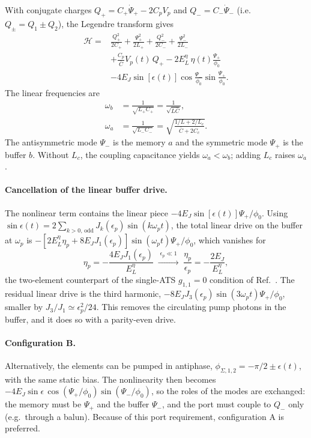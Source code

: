 \documentclass[aps,prx,reprint,floatfix,amsmath,amssymb,longbibliography]{revtex4-2}
\begin{document}
With conjugate charges $Q_+=C_+\dot{\Psi}_+-2C_pV_p$ and
$Q_-=C_-\dot{\Psi}_-$ (i.e.\ $Q_\pm=Q_1\pm Q_2$), the Legendre transform
gives
\begin{equation}
\begin{aligned}
  \mathcal{H}={}&\frac{Q_+^2}{2C_+}+\frac{\Psi_+^2}{2L_+}
  +\frac{Q_-^2}{2C_-}+\frac{\Psi_-^2}{2L_-}\\
  &+\frac{C_p}{\bar{C}}V_p(t)\,Q_+
  -2E_L^\eta\,\eta(t)\frac{\Psi_+}{\phi_0}\\
  &-4E_J\sin[\epsilon(t)]\cos\frac{\Psi_-}{\phi_0}\sin\frac{\Psi_+}{\phi_0}.
\end{aligned}
\label{eq:app_H_bis}
\end{equation}
The linear frequencies are
\begin{equation}
\begin{aligned}
  \omega_b&=\frac{1}{\sqrt{L_+C_+}}=\frac{1}{\sqrt{L\bar{C}}},\\
  \omega_a&=\frac{1}{\sqrt{L_-C_-}}=\sqrt{\frac{1/L+2/L_c}{\bar{C}+2C_c}} .
\end{aligned}
\end{equation}
The antisymmetric mode $\Psi_-$ is the memory $a$ and the symmetric mode
$\Psi_+$ is the buffer $b$. Without $L_c$, the coupling capacitance
yields $\omega_a<\omega_b$; adding $L_c$ raises $\omega_a$.

\paragraph{Cancellation of the linear buffer drive.}
The nonlinear term contains the linear piece
$-4E_J\sin[\epsilon(t)]\Psi_+/\phi_0$. Using
$\sin\epsilon(t)=2\sum_{k>0,\,\mathrm{odd}}J_k(\epsilon_p)\sin(k\omega_pt)$,
the total linear drive on the buffer at $\omega_p$ is
$-[2E_L^\eta\eta_p+8E_JJ_1(\epsilon_p)]\sin(\omega_pt)\Psi_+/\phi_0$,
which vanishes for
\begin{equation}
  \eta_p=-\frac{4E_JJ_1(\epsilon_p)}{E_L^\eta}
  \;\xrightarrow{\;\epsilon_p\ll1\;}\;
  \frac{\eta_p}{\epsilon_p}=-\frac{2E_J}{E_L^\eta},
  \label{eq:app_eta}
\end{equation}
the two-element counterpart of the single-ATS
$g_{1,1}=0$ condition of Ref.~\cite{Carde2025Feb}. The residual linear drive is
the third harmonic, $-8E_JJ_3(\epsilon_p)\sin(3\omega_pt)\Psi_+/\phi_0$,
smaller by $J_3/J_1\simeq\epsilon_p^2/24$. This removes the circulating
pump photons in the buffer, and it does so with a parity-even drive.

\paragraph{Configuration B.}
Alternatively, the elements can be pumped in antiphase,
$\phi_{\Sigma,1,2}=-\pi/2\pm\epsilon(t)$, with the same static bias. The
nonlinearity then becomes
$-4E_J\sin\epsilon\,\cos(\Psi_+/\phi_0)\sin(\Psi_-/\phi_0)$, so the roles
of the modes are exchanged: the memory must be $\Psi_+$ and the buffer
$\Psi_-$, and the port must couple to $Q_-$ only (e.g.\ through a balun).
Because of this port requirement, configuration A is preferred.
\end{document}
